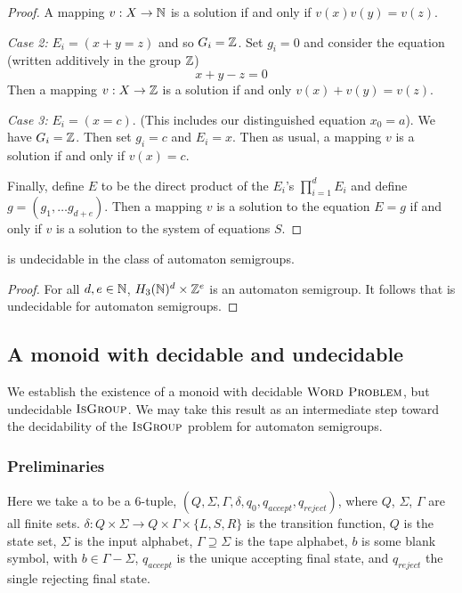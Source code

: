 \documentclass[11pt, titlepage]{article}
\begin{document}
\begin{proof}
  A mapping $v : X \rightarrow \mathbb{N}$ is a solution if and only if
  $v(x)v(y) = v(z)$.

  \textit{Case 2:} $E_i = (x+y=z)$ and so $G_i= \mathbb{Z}$. Set $g_i = 0$ and
  consider the equation (written additively in the group $\mathbb{Z}$)
  \[
    x+y-z = 0
  \]
  Then a mapping $v : X \rightarrow \mathbb{Z}$ is a solution if
  and only $v(x) + v(y) = v(z)$.

  \textit{Case 3:} $E_i = (x = c)$. (This includes our distinguished
  equation $x_0 = a$). We have $G_i = \mathbb{Z}$. Then set $g_i = c$ and
  $E_i = x$. Then as usual, a mapping $v$ is a solution if and only if
  $v(x) = c$.

  Finally, define $E$ to be the direct product of the $E_i$'s
  $\prod_{i=1}^d E_i$ and define $g = (g_1, \ldots g_{d+e})$. Then a
  mapping $v$ is a solution to the equation $E = g$ if and only if $v$
  is a solution to the system of equations $S$.
\end{proof} %

\begin{theorem}
   is undecidable in the class of
  automaton semigroups.
\end{theorem}
\begin{proof}

For all $d, e \in \mathbb{N}$, $H_3(\mathbb{N})^d \times \mathbb{Z}^e$ is an automaton
semigroup. It follows that  is
undecidable for automaton semigroups.

\end{proof} %

\subsection{A monoid with decidable  and undecidable } 

We establish the existence of a monoid with decidable
$\textsc{Word Problem}$, but undecidable $\textsc{IsGroup}$. We may
take this result as an intermediate step toward the decidability of
the $\textsc{IsGroup}$ problem for automaton semigroups.

\subsubsection*{Preliminaries}
Here we take a  to be a 6-tuple,
$(Q, \Sigma, \Gamma, \delta, q_0, q_{accept}, q_{reject})$, where $Q$,
$\Sigma$, $\Gamma$ are all finite sets.
$\delta : Q \times \Sigma \rightarrow Q\times \Gamma \times \{L,S,R\}$
is the transition function, $Q$ is the state set, $\Sigma$ is the
input alphabet, $\Gamma \supseteq \Sigma$ is the tape alphabet, $b$ is
some blank symbol, with $b \in \Gamma - \Sigma$, $q_{accept}$ is the
unique accepting final state, and $q_{reject}$ the single rejecting
final state.
\end{document}
